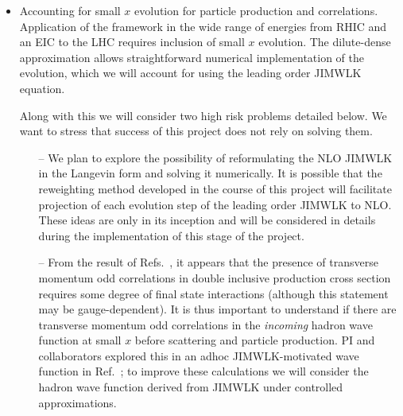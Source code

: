 \begin{itemize}
			\item Accounting for small $x$ evolution for particle production and correlations. 
				Application of the framework in the wide range of energies from RHIC and an EIC to the LHC  requires 
				inclusion of small $x$ evolution. The dilute-dense approximation allows straightforward 
				numerical implementation  of the evolution, which we will account for using the leading order 
				JIMWLK equation. 

				Along with this we will consider two high risk problems detailed below. 
				We want to stress that success of this project does not rely on solving them. %
				\begin{itemize}
					\item[--]
				We  plan to explore the possibility of reformulating the NLO JIMWLK in the Langevin form and 
				solving it numerically. It is possible that the reweighting method developed in the course of this  project 
				will facilitate projection of each evolution step of the leading order JIMWLK to NLO. These ideas are only 
				in its inception and will be considered in details during the implementation of this stage of the project.
					\item[--]
				From the result of Refs.~\cite{McLerran:2016snu,Kovchegov:2018jun}, it appears that 
				the presence of transverse momentum odd correlations in double inclusive production cross section 
				requires some degree of final state interactions (although 
				this statement may be gauge-dependent). It is thus important to understand if there
				are transverse momentum odd correlations in the {\it incoming} hadron wave function at small $x$
				before scattering and particle production. PI and collaborators  explored  this in an adhoc  JIMWLK-motivated 
				wave function in Ref.~\cite{Kovner:2016jfp}; to improve  these calculations  we will consider 
				the hadron wave function derived from JIMWLK under controlled approximations.  
				\end{itemize}
			

\end{itemize}
